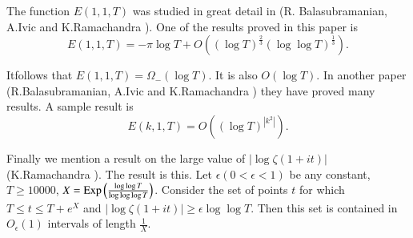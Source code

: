 The function $E(1,1,T)$ was studied in great detail in (R.\@
Balasubramanian, A.\@ Ivic and K.\@ Ramachandra \cite{Balasubramanian Ivic and  Ramachandra1}). One of
the results proved in this paper is 
$$
E(1,1,T)=-\pi \log T+O\left((\log T)^{\frac{2}{3}}(\log\log
T)^{\frac{1}{3}}\right). 
$$ 

It\pageoriginale follows that $E(1,1,T)=\Omega_{-}(\log T)$. It is
also $O(\log T)$. In another paper (R.\@ Balasubramanian, A.\@ Ivic and
K.\@ Ramachandra \cite{Balasubramanian Ivic and Ramachandra2}) they have proved many results. A  sample
result is
$$
E(k,1,T)=O\left((\log T)^{|k^{2}|}\right).
$$

Finally we mention a result on the large value of $|\log \zeta(1+it)|$
(K.\@ Ramachandra \cite{Ramachandra25}). The result is this. Let
$\epsilon(0<\epsilon<1)$ be any constant, $T\geq 10000$,
$X=\operatorname{Exp}\left(\frac{\log\log T}{\log\log\log T}\right)$. Consider the
set of points $t$ for which $T\leq t\leq T+e^{X}$ and $|\log
\zeta(1+it)|\geq \epsilon\log\log T$. Then this set is contained in
$O_{\epsilon}(1)$ intervals of length $\frac{1}{X}$.


